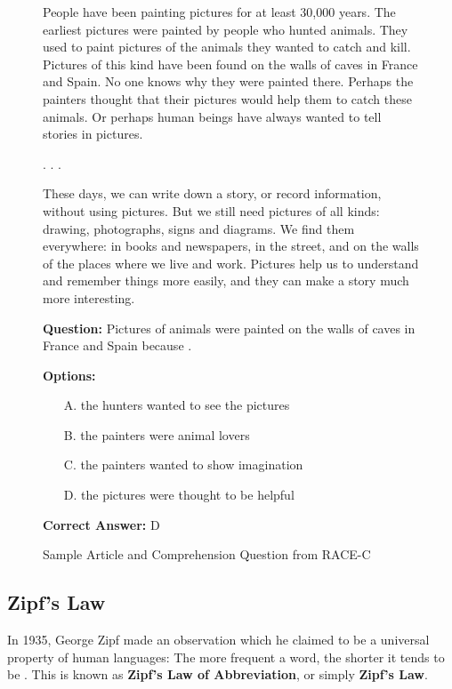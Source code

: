 \begin{figure}[htbp]
	\centering
	\begin{tcolorbox}[colback=gray!5!white, colframe=black]
		\small
		People have been painting pictures for at least 30,000 years. The earliest pictures were painted by people who hunted animals. They used to paint pictures of the animals they wanted to catch and kill. Pictures of this kind have been found on the walls of caves in France and Spain. No one knows why they were painted there. Perhaps the painters thought that their pictures would help them to catch these animals. Or perhaps human beings have always wanted to tell stories in pictures.
		
		.
		.
		.
		
		These days, we can write down a story, or record information, without using pictures. But we still need pictures of all kinds: drawing, photographs, signs and diagrams. We find them everywhere: in books and newspapers, in the street, and on the walls of the places where we live and work. Pictures help us to understand and remember things more easily, and they can make a story much more interesting.
		\vspace{0.5em}

		\textbf{Question:} Pictures of animals were painted on the walls of caves in France and Spain because \underline{\hspace{3cm}}.
		
		\textbf{Options:}
		\begin{itemize}
			\item[A.] the hunters wanted to see the pictures
			\item[B.] the painters were animal lovers
			\item[C.] the painters wanted to show imagination
			\item[D.] the pictures were thought to be helpful
		\end{itemize}
		
		\textbf{Correct Answer:} D
	\end{tcolorbox}
	\caption{Sample Article and Comprehension Question from RACE-C}
	\label{fig:race-c-sample}
\end{figure}

\subsection{Zipf's Law}
In 1935, George Zipf made an observation which he claimed to be a universal property of human languages: The more frequent a word, the 
shorter it tends to be \cite{kanwalZipfsLawAbbreviation2017}. This is known as \textbf{Zipf's Law of Abbreviation}, or simply \textbf{Zipf's Law}.

